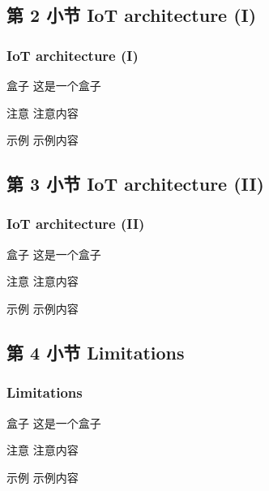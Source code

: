 \documentclass[
    aspectratio=169,                   %
]{beamer}
\begin{document}
\subsection{第 2 小节 IoT architecture (I)}

    \begin{frame}
        \frametitle{IoT architecture (I)}
        
        \begin{block}{盒子}
            这是一个盒子\cite{novo}
        \end{block}

        \begin{alertblock}{注意}
            注意内容
        \end{alertblock}

        \begin{exampleblock}{示例}
            示例内容
        \end{exampleblock}
    \end{frame}

\subsection{第 3 小节 IoT architecture (II)}

    \begin{frame}
        \frametitle{IoT architecture (II)}
        
        \begin{block}{盒子}
            这是一个盒子\cite{ouaddah}
        \end{block}

        \begin{alertblock}{注意}
            注意内容
        \end{alertblock}

        \begin{exampleblock}{示例}
            示例内容
        \end{exampleblock}
    \end{frame}

\subsection{第 4 小节 Limitations}

    \begin{frame}
        \frametitle{Limitations}
        
        \begin{block}{盒子}
            这是一个盒子\cite{novo}
        \end{block}

        \begin{alertblock}{注意}
            注意内容
        \end{alertblock}

        \begin{exampleblock}{示例}
            示例内容
        \end{exampleblock}
    \end{frame}
\end{document}
